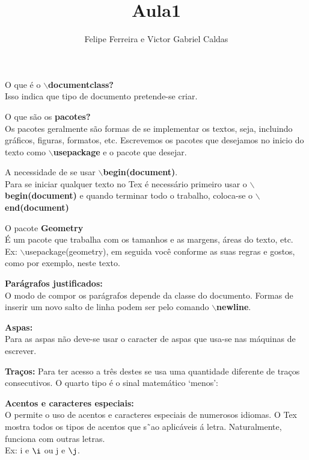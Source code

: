 \documentclass[a4paper, 12pt]{article}
\title{Aula1}
\author{Felipe Ferreira e Victor Gabriel Caldas}
\begin{document}
\maketitle



\begin{flushleft}

O que é o \textbf{$\backslash$documentclass?}
\\
Isso indica que tipo de documento pretende-se criar. \singlespacing

O que são os \textbf{pacotes?} 
\\
Os pacotes geralmente são formas de se implementar os textos, seja, incluindo gráficos, figuras, formatos, etc. Escrevemos os pacotes que desejamos no inicio do texto como \textbf{$\backslash$usepackage} e o pacote que desejar. \singlespacing

A necessidade de se usar \textbf{$\backslash$begin(document)}.
\\
Para se iniciar qualquer texto no Tex é necessário primeiro usar o \textbf{$\backslash$begin(document)} e quando terminar todo o trabalho, coloca-se o \textbf{$\backslash$end(document)} \singlespacing

O pacote \textbf{Geometry}
\\
É um pacote que trabalha com os tamanhos e as margens, áreas do texto, etc.
\\
Ex: $\backslash$usepackage(geometry), em seguida você conforme as suas regras e gostos, como por exemplo, neste texto. \singlespacing

\textbf{Parágrafos justificados:}
\\
O modo de compor os parágrafos depende da classe do documento. Formas de inserir um novo salto de linha podem ser pelo comando \textbf{$\backslash$newline}. \singlespacing

\textbf{Aspas:}
\\
Para as aspas não deve-se usar o caracter de aspas que usa-se nas máquinas de escrever. \singlespacing

\textbf{Traços:}
\newline
Para ter acesso a três destes se usa uma quantidade diferente de traços consecutivos. O quarto tipo é o sinal matemático ‘menos’: \singlespacing

\textbf{Acentos e caracteres especiais:}
\\
O permite o uso de acentos e caracteres especiais de numerosos idiomas. O Tex mostra todos os tipos de acentos que s˜ao aplicáveis á letra. Naturalmente, funciona com outras letras.
\\
Ex: i e $\i$ ou j e $\j$. \singlespacing


\end{flushleft}
\end{document}
